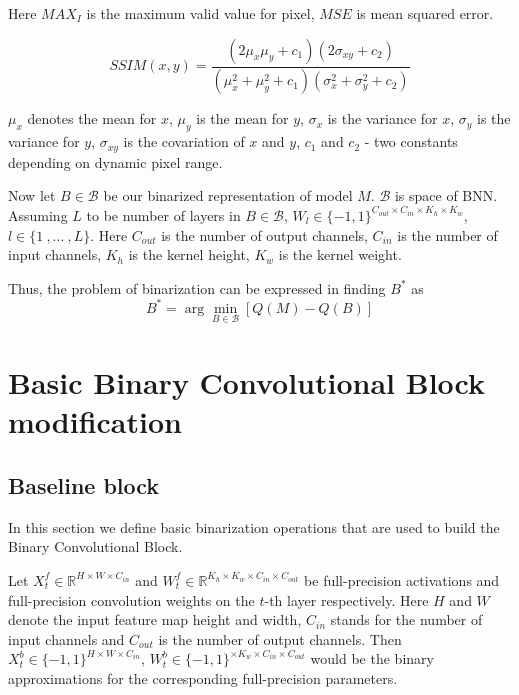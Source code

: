 \documentclass{article}
\begin{document}
Here $MAX_I$ is the maximum valid value for pixel, $MSE$ is mean squared error.

\begin{equation}
    SSIM(x, y) = \frac{(2\mu_x\mu_y + c_1)(2\sigma_{xy} + c_2)}{(\mu_x^2 + \mu_y^2 + c_1)(\sigma_{x}^2 + \sigma_{y}^2 + c_2)}
\end{equation}

$\mu_x$ denotes the mean for $x$, $\mu_y$ is the mean for $y$, $\sigma_x$ is the variance for $x$, $\sigma_y$ is the variance for $y$, $\sigma_{xy}$ is the covariation of $x$ and $y$, $c_1$ and $c_2$ - two constants depending on dynamic pixel range.

Now let $B \in \mathcal{B}$ be our binarized representation of model $M$. $\mathcal{B}$ is space of BNN. Assuming $L$ to be number of layers in $B \in \mathcal{B}$, $W_l \in \{-1, 1\}^{C_{out} \times C_{in} \times K_h \times K_w}$, $l \in \{1 \ , ... \ , L\}$. Here $C_{out}$ is the number of output channels, $C_{in}$ is the number of input channels, $K_h$ is the kernel height, $K_w$ is the kernel weight. 


Thus, the problem of binarization can be expressed in finding $B^{*}$ as
\begin{equation}
    B^{*} = \arg\min\limits_{B \in \mathcal{B}} \left[Q(M) - Q(B)\right]
\end{equation}

\section{Basic Binary Convolutional Block modification}
\subsection{Baseline block}

In this section we define basic binarization operations that are used to build the Binary Convolutional Block.

Let $X_t^f \in \mathbb{R}^{H \times W \times C_{in}}$ and $W_t^f \in \mathbb{R}^{K_{h} \times K_{w} \times C_{in} \times C_{out}}$ be full-precision activations and full-precision convolution weights on the $t$-th layer respectively. Here $H$ and $W$ denote the input feature map height and width, $C_{in}$ stands for the number of input channels and $C_{out}$ is the number of output channels. Then $X_t^b \in \{-1, 1\}^{H \times W \times C_{in}}$, $W_t^b \in \{-1, 1\}^{\times K_{w} \times C_{in} \times C_{out}}$ would be the binary approximations for the corresponding full-precision parameters.
\end{document}
